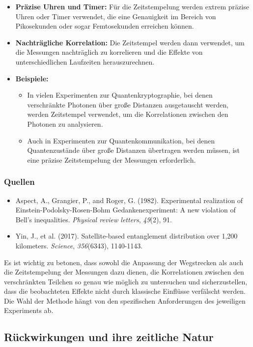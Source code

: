 \documentclass{article}
\begin{document}
	\begin{itemize}
		\item \textbf{Präzise Uhren und Timer:} Für die Zeitstempelung werden extrem präzise Uhren oder Timer verwendet, die eine Genauigkeit im Bereich von Pikosekunden oder sogar Femtosekunden erreichen können.
		\item \textbf{Nachträgliche Korrelation:} Die Zeitstempel werden dann verwendet, um die Messungen nachträglich zu korrelieren und die Effekte von unterschiedlichen Laufzeiten herauszurechnen.
		\item \textbf{Beispiele:}
		\begin{itemize}
			\item In vielen Experimenten zur Quantenkryptographie, bei denen verschränkte Photonen über große Distanzen ausgetauscht werden, werden Zeitstempel verwendet, um die Korrelationen zwischen den Photonen zu analysieren.
			\item Auch in Experimenten zur Quantenkommunikation, bei denen Quantenzustände über große Distanzen übertragen werden müssen, ist eine präzise Zeitstempelung der Messungen erforderlich.
		\end{itemize}
	\end{itemize}
	
	\subsubsection{Quellen}
	
	\begin{itemize}
		\item Aspect, A., Grangier, P., and Roger, G. (1982). Experimental realization of Einstein-Podolsky-Rosen-Bohm Gedankenexperiment: A new violation of Bell's inequalities. \textit{Physical review letters}, \textit{49}(2), 91.
		\item Yin, J., et al. (2017). Satellite-based entanglement distribution over 1,200 kilometers. \textit{Science}, \textit{356}(6343), 1140-1143.
	\end{itemize}
	
	Es ist wichtig zu betonen, dass sowohl die Anpassung der Wegstrecken als auch die Zeitstempelung der Messungen dazu dienen, die Korrelationen zwischen den verschränkten Teilchen so genau wie möglich zu untersuchen und sicherzustellen, dass die beobachteten Effekte nicht durch klassische Einflüsse verfälscht werden. Die Wahl der Methode hängt von den spezifischen Anforderungen des jeweiligen Experiments ab.
	\subsection{Rückwirkungen und ihre zeitliche Natur}
	
\end{document}
